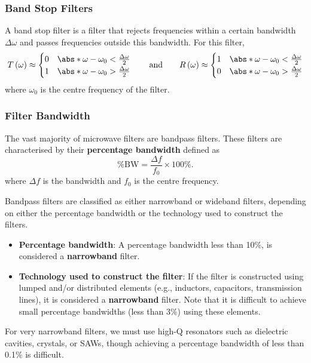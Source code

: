 \documentclass{article}
\begin{document}
\subsubsection{Band Stop Filters}
A band stop filter is a filter that rejects frequencies within a certain
bandwidth \(\Delta{\omega}\) and passes frequencies outside this
bandwidth. For this filter,
\begin{equation*}
    T\left( \omega \right) \approx \begin{cases}
        0 & \abs*{\omega - \omega_0} < \frac{\Delta{\omega}}{2} \\
        1 & \abs*{\omega - \omega_0} > \frac{\Delta{\omega}}{2}
    \end{cases}
    \qquad \text{and} \qquad
    R\left( \omega \right) \approx \begin{cases}
        1 & \abs*{\omega - \omega_0} < \frac{\Delta{\omega}}{2} \\
        0 & \abs*{\omega - \omega_0} > \frac{\Delta{\omega}}{2}
    \end{cases}
\end{equation*}
where \(\omega_0\) is the centre frequency of the filter.
\subsubsection{Filter Bandwidth}
The vast majority of microwave filters are bandpass filters. These filters
are characterised by their \textbf{percentage bandwidth} defined as
\begin{equation*}
    \%\mathrm{BW} = \frac{\Delta{f}}{f_0} \times 100\%.
\end{equation*}
where \(\Delta{f}\) is the bandwidth and \(f_0\) is the centre frequency.

Bandpass filters are classified as either narrowband or wideband filters,
depending on either the percentage bandwidth or the technology used to
construct the filters.
\begin{itemize}
    \item \textbf{Percentage bandwidth}: A percentage bandwidth less
    than 10\%, is considered a \textbf{narrowband} filter.
    \item \textbf{Technology used to construct the filter}: If the filter
    is constructed using lumped and/or distributed elements (e.g.,
    inductors, capacitors, transmission lines), it is considered a
    \textbf{narrowband} filter. Note that it is difficult to achieve
    small percentage bandwidths (less than 3\%) using these elements.
\end{itemize}
For very narrowband filters, we must use high-Q resonators such as dielectric
cavities, crystals, or SAWs, though achieving a percentage bandwidth of
less than 0.1\% is difficult.
\end{document}
